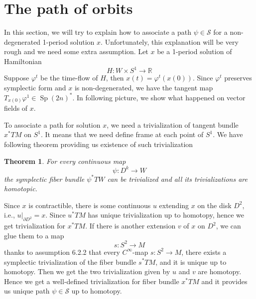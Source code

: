 \documentclass[a4paper,11pt]{amsart}
\DeclareMathOperator{\Sp}{Sp}
\theoremstyle{plain}
\theoremstyle{theorem}
\newtheorem{thm}{Theorem}[subsection]
\theoremstyle{definition}
\begin{document}
\section{The path of orbits}
In this section, we will try to explain how to associate a path $\psi \in \mathcal{S}$ for a non-degenerated 1-period solution $x$. Unfortunately, this explanation will be very rough and we need some extra assumption.
Let $x$ be a 1-period solution of Hamiltonian
\[
H \colon W \times S^1 \to \mathbb{R}
\]
Suppose $\varphi^t$ be the  time-flow of $H$, then $x(t) = \varphi^t(x(0))$. Since $\varphi^t$ preserves symplectic form and $x$ is non-degenerated, we have the tangent map $T_{x(0)}\varphi^1 \in 
\Sp(2n)^*$. In following picture, we show what happened on vector fields of $x$.

To associate a path for solution $x$, we need a trivialization of tangent bundle $x^* TM$ on $S^1$. It means that we need define frame at each point of $S^1$. We have following theorem providing us existence of such trivialization
\begin{thm}
	For every continuous map \[\psi \colon D^k \to W\]
	the symplectic fiber bundle $\psi^* TW$ can be trivialized and all its trivializations are homotopic.
\end{thm} 
Since $x$ is contractible, there is some continuous $u$ extending $x$ on the disk $D^2$, i.e., $u|_{\partial D^2} = x$. Since $u^*TM$ has unique trivialization up to homotopy, hence we get trivialization for $x^*TM$. If there is another extension $v$ of $x$ on $D^2$, we can glue them to a map 
\[
s\colon S^2 \to M
\]
thanks to assumption 6.2.2 that every $C^\infty$-map $s: S^2 \to M$, there exists a symplectic trivialization of the fiber bundle $s^* TM$, and it is unique up to homotopy. Then we get the two trivialization given by $u$ and $v$ are homotopy. Hence we get a well-defined trivialization for fiber bundle $x^*TM$ and it provides us unique path $\psi \in \mathcal{S}$ up to homotopy.
\end{document}
